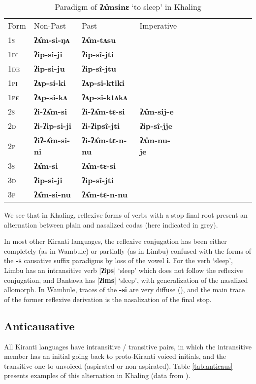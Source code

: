 \documentclass[oldfontcommands,oneside,a4paper,11pt]{article}
\newcommand{\ipa}[1]{\textbf{{\phon\mbox{#1}}}} %
\newcommand{\grise}[1]{\cellcolor{lightgray}\textbf{#1}}
\newcommand{\dhatu}[2]{|\ipa{#1}| `#2'}
\begin{document}
\begin{table}[h]
\label{tab:ip.vr} \centering 
\caption{Paradigm of \ipa{ʔʌ̂msinɛ}  `to sleep' in Khaling }
\begin{tabular}{l|l|l|l|l|l|l|l|l|l|l|l|l} 
\toprule
Form& Non-Past & Past & Imperative \\
\textsc{1s} & \ipa{ʔʌ̂m-si-ŋʌ}  \grise{}& \ipa{ʔʌ̂m-tʌsu} \grise{}&\\ 
\textsc{1di} &\ipa{ʔip-si-ji}  & \ipa{ʔip-sî-jti}  & \\
\textsc{1de} &\ipa{ʔip-si-ju}  & \ipa{ʔip-sî-jtu}  & \\ 
\textsc{1pi} &\ipa{ʔʌp-si-ki}  & \ipa{ʔʌp-si-ktiki} & \\ 
\textsc{1pe} &\ipa{ʔʌp-si-kʌ}  & \ipa{ʔʌp-si-ktʌkʌ} &  \\ 
\textsc{2s} & \ipa{ʔi-ʔʌ̂m-si}  \grise{}& \ipa{ʔi-ʔʌ̂m-tɛ-si} \grise{} & \ipa{ʔʌ̂m-sij-e}  \grise{}\\ 
\textsc{2d} & \ipa{ʔi-ʔip-si-ji}  & \ipa{ʔi-ʔipsî-jti}  & \ipa{ʔip-sî-jje}    \\
\textsc{2p} & \ipa{ʔiʔ-ʌ̂m-si-ni} \grise{} & \ipa{ʔi-ʔʌ̂m-tɛ-n-nu} \grise{} & \ipa{ʔʌ̂m-nu-je}  \grise{}\\ 
\textsc{3s} & \ipa{ʔʌ̂m-si}  \grise{}& \ipa{ʔʌ̂m-tɛ-si}  \grise{} &\\ 
\textsc{3d} & \ipa{ʔip-si-ji}  & \ipa{ʔip-sî-jti} &  \\ 
\textsc{3p} & \ipa{ʔʌ̂m-si-nu}\grise{}  & \ipa{ʔʌ̂m-tɛ-n-nu} \grise{}&\\ 
\bottomrule
\end{tabular}
\end{table}

We see that in Khaling, reflexive forms of verbs with a stop final root present an alternation between plain and nasalized codas (here indicated in grey). 

In most other Kiranti languages, the reflexive conjugation has been either completely (as in Wambule) or partially (as in Limbu) confused with the forms of the \ipa{-s} causative suffix paradigms by loss of the vowel \ipa{i}. For the verb `sleep', Limbu has an intransitive verb \dhatu{ʔips}{sleep} which does not follow the reflexive conjugation, and Bantawa has \dhatu{ʔims}{sleep}, with generalization of the nasalized allomorph. In Wambule, traces of the \ipa{-si} are very diffuse (\citealt[305]{opgenort04wambule}), and the main trace of the former reflexive derivation is the nasalization of the final stop.
 

\subsection{Anticausative} \label{sec:anticaus}
All Kiranti languages have intransitive / transitive pairs, in which the intransitive member has an initial going back to proto-Kiranti voiced initials, and the transitive one to unvoiced (aspirated or non-aspirated). Table \ref{tab:anticaus} presents examples of this alternation in Khaling (data from \citealt{jacques15derivational.khaling}).
\end{document}
